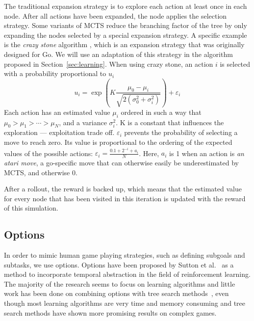 The traditional expansion strategy is to explore each action at least once in
each node. After all actions have been expanded, the node applies the selection
strategy. Some variants of MCTS reduce the branching
factor of the tree by only expanding the nodes selected by a special expansion
strategy. A specific example is the \emph{crazy stone} algorithm
\cite{coulom2007efficient}, which is an expansion strategy that was originally
designed for Go. We will use an adaptation of this strategy in the algorithm
proposed in Section~\ref{sec:learning}.  When using crazy stone, an action $i$
is selected with a probability proportional to $u_i$ \begin{equation}
\label{eq:crazystone} u_i = \exp\left(K \frac{\mu_0 -
\mu_i}{\sqrt{2\left(\sigma_0^2 + \sigma_i^2\right)}}\right) + \varepsilon_i
\end{equation} Each action has an estimated value $\mu_i$ ordered in such a way
that $\mu_0 > \mu_1 > \cdots > \mu_N$, and a variance $\sigma_i^2$. K is a
constant that influences the exploration --- exploitation trade off.
$\varepsilon_i$ prevents the probability of selecting a move to reach zero. Its
value is proportional to the ordering of the expected values of the possible
actions: $\varepsilon_i = \frac{0.1 + 2^{-i} + a_i}{N}$\@.  Here, $a_i$ is 1
when an action is \emph{an atari move}, a go-specific move that can otherwise
easily be underestimated by MCTS, and otherwise 0.

After a rollout, the reward is backed up, which means that the estimated value
for every node that has been visited in this iteration is updated with the
reward of this simulation. 

\subsection{Options}
\label{subsec:options}

In order to mimic human game playing strategies, such as defining subgoals and
subtasks, we use options. Options have been proposed by Sutton et
al.~\cite{sutton1999between} as a method to incorporate temporal abstraction in
the field of reinforcement learning. The majority of the research seems to focus
on learning algorithms and little work has been done on combining options with
tree search methods~\cite{barto2003recent}, even though most learning algorithms
are very time and memory consuming and tree search methods have shown more
promising results on complex games.

